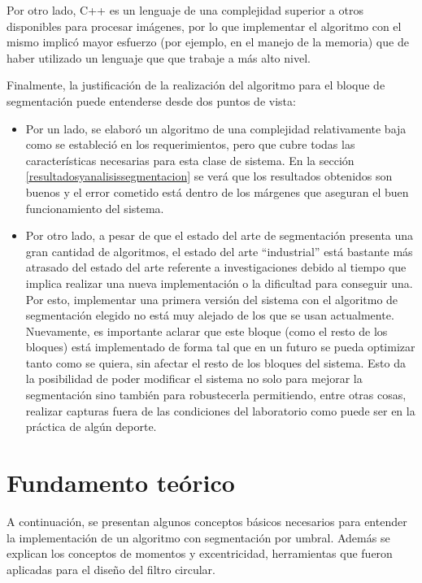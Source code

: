 Por otro lado, C++ es un lenguaje de una complejidad superior a otros disponibles para procesar imágenes, por lo que implementar el algoritmo con el mismo implicó mayor esfuerzo (por ejemplo, en el manejo de la memoria) que de haber utilizado un lenguaje que que trabaje a más alto nivel.

Finalmente, la justificación de la realización del algoritmo para el bloque de segmentación puede entenderse desde dos puntos de vista: 
\begin{itemize}
 \item Por un lado, se elaboró un algoritmo de una complejidad relativamente baja como se estableció en los requerimientos, pero que cubre todas las características necesarias para esta clase de sistema. En la sección \ref{resultadosyanalisissegmentacion} se verá que los resultados obtenidos son buenos y el error cometido está dentro de los márgenes que aseguran el buen funcionamiento del sistema.
 \item Por otro lado, a pesar de que el estado del arte de segmentación presenta una gran cantidad de algoritmos, el estado del arte ``industrial'' está bastante más atrasado del estado del arte referente a investigaciones debido al tiempo que implica realizar una nueva implementación o la dificultad para conseguir una. Por esto, implementar una primera versión del sistema con el algoritmo de segmentación elegido no está muy alejado de los que se usan actualmente. Nuevamente, es importante aclarar que este bloque (como el resto de los bloques) está implementado de forma tal que en un futuro se pueda optimizar tanto como se quiera, sin afectar el resto de los bloques del sistema. Esto da la posibilidad de poder modificar el sistema no solo para mejorar la segmentación sino también para robustecerla permitiendo, entre otras cosas, realizar capturas fuera de las condiciones del laboratorio como puede ser en la práctica de algún deporte.
\end{itemize}


\section{Fundamento teórico}
\label{fundamentoteoseg}

A continuación, se presentan algunos conceptos básicos necesarios para entender la implementación de un algoritmo con segmentación por umbral. Además se explican los conceptos de momentos y excentricidad, herramientas que fueron aplicadas para el diseño del filtro circular.

